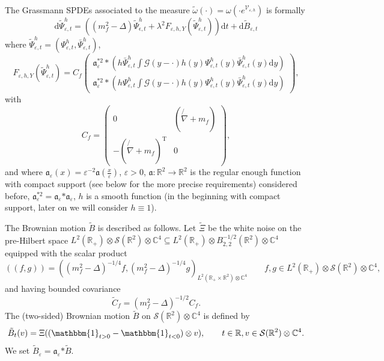 \documentclass{article}
\newcommand{\Tau}{\mathrm{T}}
\newcommand{\asterisk}{\mathord{*}}
\newcommand{\mathd}{\mathrm{d}}
\begin{document}
The Grassmann SPDEs associated to the measure $\tilde{\omega} (\cdot) = \omega
(\cdot e^{\mathcal{V}_{\varepsilon, h}})$ is formally
\begin{equation}
  \mathd \tilde{\Psi}_{\varepsilon, t}^h = ((m_f^2 - \Delta)
  \tilde{\Psi}_{\epsilon, t}^h + \lambda^2 F_{\varepsilon, h, Y}
  (\tilde{\Psi}_{\varepsilon, t}^h)) \mathd t + \mathd \tilde{B}_{\varepsilon,
  t} \label{eq:stochasticquantization}
\end{equation}
where $\tilde{\Psi}_{\varepsilon, t}^h = (\Psi_{\varepsilon, t}^h,
\bar{\Psi}_{\varepsilon, t}^h)$,
\[ F_{\varepsilon, h, Y} (\tilde{\Psi}_{\varepsilon, t}^h) = C_f \left(
   \begin{array}{l}
     \mathfrak{a}_{\varepsilon}^{\asterisk 2} \ast \left( h
     \bar{\Psi}_{\varepsilon, t}^h \int \mathcal{G} (y - \cdot) h (y)
     \Psi_{\varepsilon, t}^h (y) \bar{\Psi}_{\varepsilon, t}^h (y) \mathd y
     \right)\\
     \mathfrak{a}_{\varepsilon}^{\asterisk 2} \ast \left( h \Psi_{\varepsilon,
     t}^h \int \mathcal{G} (y - \cdot) h (y) \Psi_{\varepsilon, t}^h (y)
     \bar{\Psi}_{\varepsilon, t}^h (y) \mathd y \right)
   \end{array} \right), \]
with
\[ C_f = \left(\begin{array}{cc}
     0 & \left( \not{\nabla} + m_f \right)\\
     - \left( \not{\nabla} + m_f \right)^{\Tau} & 0
   \end{array}\right), \]
and where $\mathfrak{a}_{\varepsilon} (x) = \varepsilon^{- 2} \mathfrak{a}
\left( \frac{x}{\varepsilon} \right)$, $\varepsilon > 0$, $\mathfrak{a} :
\mathbb{R}^2 \rightarrow \mathbb{R}^2$ is the regular enough function with
compact support (see below for the more precise requirements) considered
before, $\mathfrak{a}_{\varepsilon}^{\asterisk 2} = \mathfrak{a}_{\varepsilon}
\asterisk \mathfrak{a}_{\varepsilon}$, $h$ is a smooth function (in the
beginning with compact support, later on we will consider $h \equiv 1$).

The Brownian motion $\tilde{B}$ is described as follows. Let $\tilde{\Xi}$ be
the white noise on the pre-Hilbert space $L^2 (\mathbb{R}_+) \otimes
\mathcal{S} (\mathbb{R}^2) \otimes \mathbb{C}^4 \subseteq L^2 (\mathbb{R}_+)
\otimes B_{2, 2}^{- 1 / 2} (\mathbb{R}^2) \otimes \mathbb{C}^4$ equipped with
the scalar product
\begin{equation}
  ((f, g)) = ((m_f^2 - \Delta)^{- 1 / 4} f, (m_f^2 - \Delta)^{- 1 / 4} g)_{L^2
  (\mathbb{R}_+ \times \mathbb{R}^2) \otimes \mathbb{C}^4}
  \label{eq:scalarproduct} \qquad f, g \in L^2 (\mathbb{R}_+) \otimes
  \mathcal{S} (\mathbb{R}^2) \otimes \mathbb{C}^4,
\end{equation}
and having bounded covariance
\[ \tilde{C}_f = (m^2_f - \Delta)^{- 1 / 2} C_f . \]
The (two-sided) Brownian motion $\tilde{B}$ on $\mathcal{S} (\mathbb{R}^2)
\otimes \mathbb{C}^4$ is defined by
\[ \tilde{B}_t (v) = \Xi ((\mathbbm{1}_{t > 0} -\mathbbm{1}_{t < 0}) \otimes v),
   \qquad t \in \mathbb{R}, v \in \mathcal{S} (\mathbb{R}^2) \otimes
   \mathbb{C}^4 . \]
We set $\tilde{B}_{\varepsilon} = \mathfrak{a}_{\varepsilon} \asterisk
\tilde{B}$.
\end{document}
